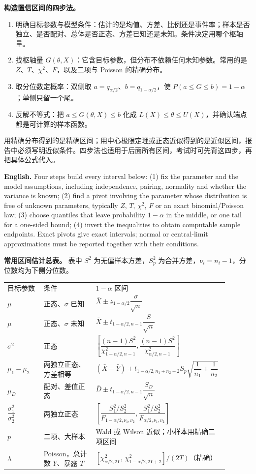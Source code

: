 \documentclass[UTF8,11pt,a4paper]{ctexart}
\newcommand{\EN}[1]{\par\noindent\textbf{English.} #1\par}
\begin{document}
\noindent\textbf{构造置信区间的四步法。}
\begin{enumerate}[label=(\arabic*)]
\item 明确目标参数与模型条件：估计的是均值、方差、比例还是事件率；样本是否独立、是否配对、总体是否正态、方差已知还是未知。条件决定用哪个枢轴量。
\item 找枢轴量 $G(\theta,X)$：它含目标参数，但分布不依赖任何未知参数。常用的是 $Z$、$T$、$\chi^2$、$F$，以及二项与 Poisson 的精确分布。
\item 取分位数定概率：双侧取 $a=q_{\alpha/2}$、$b=q_{1-\alpha/2}$，使 $P(a\le G\le b)=1-\alpha$；单侧只留一个尾。
\item 反解不等式：把 $a\le G(\theta,X)\le b$ 化成 $L(X)\le\theta\le U(X)$，并确认端点都是可计算的样本函数。
\end{enumerate}
用精确分布得到的是精确区间；用中心极限定理或正态近似得到的是近似区间，报告中必须写明近似条件。四步法也适用于后面所有区间，考试时可先背这四步，再把具体公式代入。
\EN{Four steps build every interval below: (1) fix the parameter and the model assumptions, including independence, pairing, normality and whether the variance is known; (2) find a pivot involving the parameter whose distribution is free of unknown parameters, typically $Z$, $T$, $\chi^2$, $F$ or an exact binomial/Poisson law; (3) choose quantiles that leave probability $1-\alpha$ in the middle, or one tail for a one-sided bound; (4) invert the inequalities to obtain computable sample endpoints. Exact pivots give exact intervals; normal or central-limit approximations must be reported together with their conditions.}

\noindent\textbf{常用区间估计总表。} 表中 $S^2$ 为无偏样本方差，$S_p^2$ 为合并方差，$\nu_i=n_i-1$，分位数均为下侧分位数。
\begin{center}
\small
\begin{tabular}{p{0.16\linewidth}p{0.23\linewidth}p{0.5\linewidth}}
目标参数 & 条件 & $1-\alpha$ 区间\\
$\mu$ & 正态、$\sigma$ 已知 & $\bar X\pm z_{1-\alpha/2}\dfrac{\sigma}{\sqrt n}$\\
$\mu$ & 正态、$\sigma$ 未知 & $\bar X\pm t_{1-\alpha/2,n-1}\dfrac{S}{\sqrt n}$\\
$\sigma^2$ & 正态 & $\left[\dfrac{(n-1)S^2}{\chi^2_{1-\alpha/2,n-1}},\dfrac{(n-1)S^2}{\chi^2_{\alpha/2,n-1}}\right]$\\
$\mu_1-\mu_2$ & 两独立正态、方差相等 & $(\bar X-\bar Y)\pm t_{1-\alpha/2,n_1+n_2-2}S_p\sqrt{\dfrac1{n_1}+\dfrac1{n_2}}$\\
$\mu_D$ & 配对、差值正态 & $\bar D\pm t_{1-\alpha/2,n-1}\dfrac{S_D}{\sqrt n}$\\
$\dfrac{\sigma_1^2}{\sigma_2^2}$ & 两独立正态 & $\left[\dfrac{S_1^2/S_2^2}{F_{1-\alpha/2,\nu_1,\nu_2}},\dfrac{S_1^2/S_2^2}{F_{\alpha/2,\nu_1,\nu_2}}\right]$\\
$p$ & 二项、大样本 & Wald 或 Wilson 近似；小样本用精确二项区间\\
$\lambda$ & Poisson，总计数 $Y$、暴露 $T$ & $\left[\chi^2_{\alpha/2,2Y},\ \chi^2_{1-\alpha/2,2Y+2}\right]/(2T)$（精确）\\
\end{tabular}
\end{center}
\end{document}
